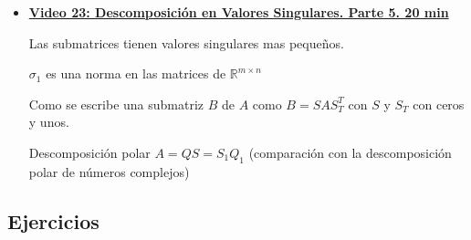 \documentclass[12pt,a4paper]{article}
\newcommand\1{\mbox{\,\vrule height-0.8pt depth1.0pt width2pc\,}}
\newcommand\2{\mbox{\,\vrule height-0.8pt depth1.0pt width1pc\,}}
\begin{document}
\begin{itemize}
     Ver a $\sigma_1$ y a $v_1$ como soluci\'on de una maximizaci\'on. Idem el resto de valores y vectores singulares.
     
     Conexi\'on entre la SVD de $A$ y $A^T$
     
     \item \href{https://youtu.be/cIH0yTo32lM}{\bf Video 23:  Descomposición en Valores Singulares. Parte 5. 20 min} 
     
     Las submatrices tienen valores singulares mas peque\~nos.
     
     $\sigma_1$ es una norma en las matrices de $\mathbb{R}^{m\times n}$
     
     Como se escribe una submatriz $B$ de $A$ como $B=S A S_T^T$ con $S $ y $S_T$ con ceros y unos.
     
     Descomposici\'on polar $A=QS=S_1 Q_1$ (comparaci\'on con la descomposici\'on polar de n\'umeros complejos)
\end{itemize}

\subsection*{Ejercicios}
\end{document}
